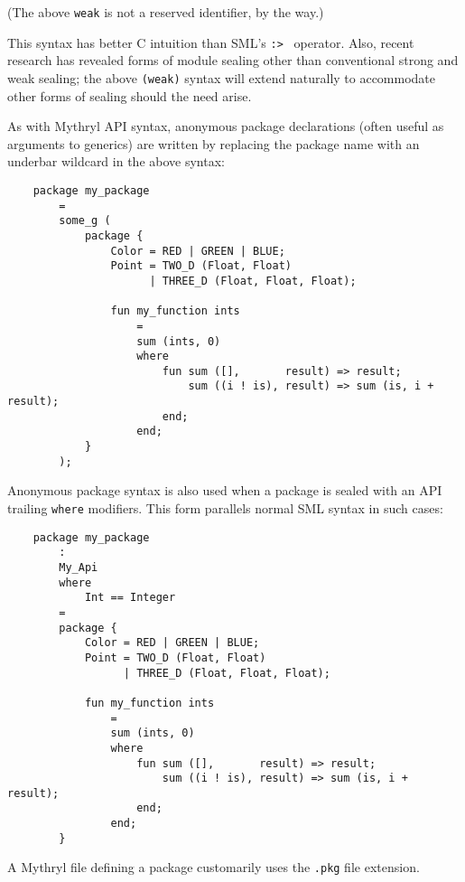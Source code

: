 (The above {\tt weak} is not a reserved identifier, by the way.)

This syntax has better C intuition than {\sc SML}'s {\tt :> } operator.  Also, 
recent research has revealed forms of module sealing other than conventional    
strong and weak sealing;  the above {\tt (weak)} syntax will extend naturally to accommodate    
other forms of sealing should the need arise.

As with Mythryl API syntax, anonymous package declarations (often useful as 
arguments to generics) are written by replacing the package name with an underbar 
wildcard in the above syntax:

\begin{verbatim}
    package my_package
        =
        some_g (
            package {
                Color = RED | GREEN | BLUE;
                Point = TWO_D (Float, Float)
                      | THREE_D (Float, Float, Float);   

                fun my_function ints
                    =
                    sum (ints, 0)
                    where
                        fun sum ([],       result) => result;
                            sum ((i ! is), result) => sum (is, i + result);
                        end;
                    end;
            }
        );
\end{verbatim}

Anonymous package syntax is also used when a package is sealed with an 
API trailing {\tt where} modifiers.  This form parallels normal {\sc SML} 
syntax in such cases:

\begin{verbatim}
    package my_package
        :
        My_Api
        where
            Int == Integer
        =
        package {
            Color = RED | GREEN | BLUE;
            Point = TWO_D (Float, Float)
                  | THREE_D (Float, Float, Float);   

            fun my_function ints
                =
                sum (ints, 0)
                where
                    fun sum ([],       result) => result;
                        sum ((i ! is), result) => sum (is, i + result);
                    end;
                end;
        }
\end{verbatim}

A Mythryl file defining a package customarily uses the {\tt .pkg} file extension.

\cutend*

